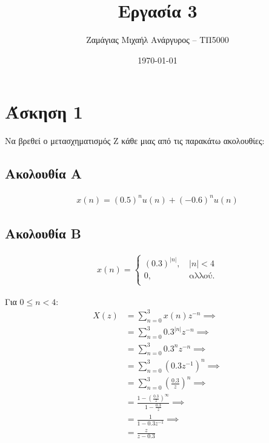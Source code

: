 \documentclass[12pt]{turabian-researchpaper}
\title{Εργασία 3}
\author{Ζαμάγιας Μιχαήλ Ανάργυρος -- ΤΠ5000}
\date{\today}
\begin{document}
\begin{titlepage}
    \maketitle
\end{titlepage}

\tableofcontents

\newpage\section{Άσκηση 1}
Να βρεθεί ο μετασχηματισμός Ζ κάθε μιας από τις παρακάτω ακολουθίες:
\subsection{Ακολουθία A}
\begin{equation*}
    \begin{aligned}
        x(n) = (0.5)^n u(n) + (-0.6)^n u(n)
    \end{aligned}
\end{equation*}

\subsection{Ακολουθία B}
\begin{equation*}
    \begin{aligned}
        x(n) = \begin{cases}
            (0.3)^{| n |} \text{, } & | n | < 4     \\
            0\text{, }              & \text{αλλού.} \\
        \end{cases}
    \end{aligned}
\end{equation*}

Για $ 0 \leq n < 4 $:
\begin{equation*}
    \begin{aligned}
        X(z) & = \sum_{n = 0}^{ 3 } x(n)z^{-n}                                          \implies \\
             & = \sum_{n = 0}^{ 3 } 0.3^{|n|} z^{-n}                                    \implies \\
             & = \sum_{n = 0}^{ 3 } 0.3^{n} z^{-n}                                      \implies \\
             & = \sum_{n = 0}^{ 3 } (0.3 z^{ -1 })^n                                    \implies \\
             & = \sum_{n = 0}^{ 3 } ( \frac{ 0.3 }{ z } )^n                             \implies \\
             & = \frac{ 1 - ( \frac{ 0.3 }{ z } )^{ \infty } }{ 1 - \frac{ 0.3 }{ z } } \implies \\
             & = \frac{ 1 }{ 1 - 0.3 z^{ -1 } }                                         \implies \\
             & = \frac{ z }{ z - 0.3 }
    \end{aligned}
\end{equation*}
\end{document}
